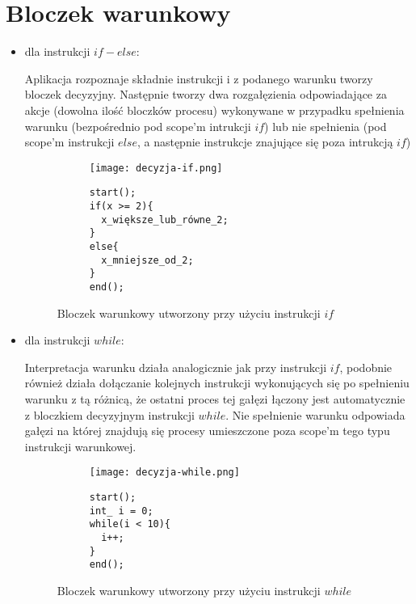 \section{Bloczek warunkowy}
\begin{itemize}
	\item dla instrukcji $if-else$: {\smallskip}
	
		Aplikacja rozpoznaje składnie instrukcji i z podanego warunku tworzy bloczek decyzyjny. Następnie tworzy dwa rozgałęzienia odpowiadające za akcje (dowolna ilość bloczków procesu) wykonywane w przypadku spełnienia warunku (bezpośrednio pod scope'm intrukcji $if$) lub nie spełnienia (pod scope'm instrukcji $else$, a następnie instrukcje znajujące się poza intrukcją $if$) 
		
			\begin{figure}[H]
  \begin{subfigure}[t]{0.49\textwidth}
    \vspace{0pt}
    \texttt{[image: decyzja-if.png]}
  \end{subfigure}\hfill
  \begin{subfigure}[t]{0.44\textwidth}
    \begin{verbatim}
start();
if(x >= 2){
  x_większe_lub_równe_2;
}
else{
  x_mniejsze_od_2;
}
end();
    \end{verbatim}
  \end{subfigure}%
  \caption{Bloczek warunkowy utworzony przy użyciu instrukcji $if$}
\end{figure}
	
	\item dla instrukcji $while$: {\smallskip}
	
		Interpretacja warunku działa analogicznie jak przy instrukcji $if$, podobnie również działa dołączanie kolejnych instrukcji wykonujących się po spełnieniu warunku z tą różnicą, że ostatni proces tej gałęzi łączony jest automatycznie z bloczkiem decyzyjnym instrukcji $while$. Nie spełnienie warunku odpowiada gałęzi na której znajdują się procesy umieszczone poza scope'm  tego typu instrukcji warunkowej.
	
				\begin{figure}[H]
  \begin{subfigure}[t]{0.49\textwidth}
    \vspace{0pt}
    \texttt{[image: decyzja-while.png]}
  \end{subfigure}\hfill
  \begin{subfigure}[t]{0.44\textwidth}
    \begin{verbatim}
start();
int_ i = 0;
while(i < 10){
  i++;
}
end();
    \end{verbatim}
  \end{subfigure}%
  \caption{Bloczek warunkowy utworzony przy użyciu instrukcji $while$}
\end{figure}	
		
\end{itemize}

